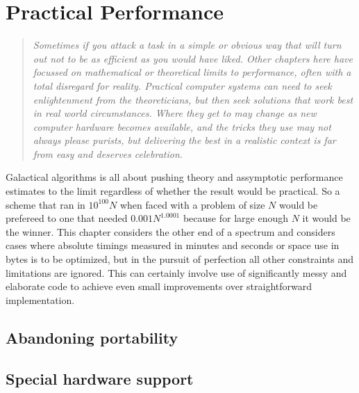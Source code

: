 \section{Practical Performance}
\begin{quotation}\textit{
Sometimes if you attack a task in a simple or obvious way that will turn
out not to be as efficient as you would have liked.
Other chapters here have focussed on mathematical or theoretical
limits to performance, often with a total disregard for reality.
Practical computer systems can need to seek enlightenment from
the theoreticians, but then seek solutions that work best in real
world circumstances. Where they get to may change as new computer hardware
becomes available, and the tricks they use may not always please purists,
but delivering the best in a realistic context is far from easy and
deserves celebration.
}\end{quotation}
Galactical algorithms is all about pushing theory and assymptotic
performance estimates to the limit regardless of whether the
result would be practical. So a scheme that ran in $10^{100}N$ when
faced with a problem of size $N$ would be prefereed to one that
needed $0.001 N^{1.0001}$ because for large enough $N$ it would be the
winner. This chapter considers the other end of a spectrum and
considers cases where absolute timings measured in minutes and seconds
or space use in bytes is to be optimized, but in the pursuit of
perfection all other constraints and limitations are ignored. This
can certainly involve use of significantly messy and elaborate code
to achieve even small improvements over straightforward implementation.


\subsection{Abandoning portability}


\subsection{Special hardware support}


